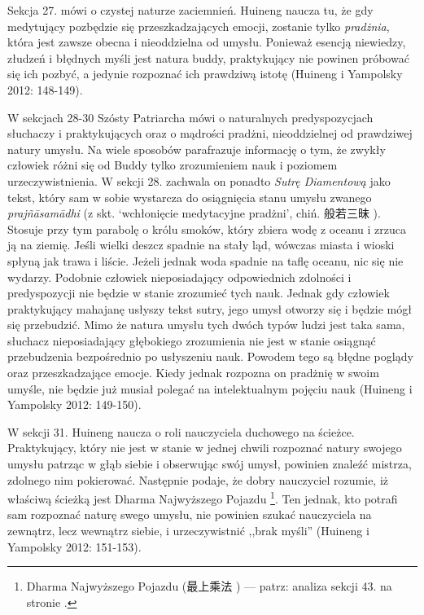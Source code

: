 Sekcja 27. mówi o czystej naturze zaciemnień.
Huineng naucza tu, że gdy medytujący pozbędzie się przeszkadzających emocji, zostanie tylko \textit{pradżnia}, która jest zawsze obecna i nieoddzielna od umysłu.
Ponieważ esencją niewiedzy, złudzeń i błędnych myśli jest natura buddy, praktykujący nie powinen próbować się ich pozbyć, a jedynie rozpoznać ich prawdziwą istotę
(Huineng i Yampolsky 2012: 148-149).

W sekcjach 28-30 Szósty Patriarcha mówi o naturalnych predyspozycjach słuchaczy i praktykujących oraz o mądrości pradżni, nieoddzielnej od prawdziwej natury umysłu.
Na wiele sposobów parafrazuje informację o tym, że zwykły człowiek różni się od Buddy tylko zrozumieniem nauk i poziomem urzeczywistnienia.
W sekcji 28. zachwala on ponadto \textit{Sutrę Diamentową} jako tekst, który sam w sobie wystarcza do osiągnięcia stanu umysłu zwanego \textit{prajñāsamādhi} (z skt. `wchłonięcie medytacyjne pradżni', chiń. 般若三昧 ).
Stosuje przy tym parabolę o królu smoków, który zbiera wodę z oceanu i zrzuca ją na ziemię.
Jeśli wielki deszcz spadnie na stały ląd, wówczas miasta i wioski spłyną jak trawa i liście.
Jeżeli jednak woda spadnie na taflę oceanu, nic się nie wydarzy.
Podobnie człowiek nieposiadający odpowiednich zdolności i predyspozycji nie będzie w stanie zrozumieć tych nauk.
Jednak gdy człowiek praktykujący mahajanę usłyszy tekst sutry, jego umysł otworzy się i będzie mógł się przebudzić.
Mimo że natura umysłu tych dwóch typów ludzi jest taka sama, słuchacz nieposiadający głębokiego zrozumienia nie jest w stanie osiągnąć przebudzenia bezpośrednio po usłyszeniu nauk.
Powodem tego są błędne poglądy oraz przeszkadzające emocje.
Kiedy jednak rozpozna on pradżnię w swoim umyśle, nie będzie już musiał polegać na intelektualnym pojęciu nauk
(Huineng i Yampolsky 2012: 149-150).

W sekcji 31. Huineng naucza o roli nauczyciela duchowego na ścieżce.
Praktykujący, który nie jest w stanie w jednej chwili rozpoznać natury swojego umysłu patrząc w głąb siebie i obserwując swój umysł, powinien znaleźć mistrza, zdolnego nim pokierować.
Następnie podaje, że dobry nauczyciel rozumie, iż właściwą ścieżką jest Dharma Najwyższego Pojazdu%
\footnote{Dharma Najwyższego Pojazdu (最上乘法 ) --- patrz: analiza sekcji 43. na stronie \pageref{SiChengFa}.}.
Ten jednak, kto potrafi sam rozpoznać naturę swego umysłu, nie powinien szukać nauczyciela na zewnątrz, lecz wewnątrz siebie, i urzeczywistnić ,,brak myśli''
(Huineng i Yampolsky 2012: 151-153).

